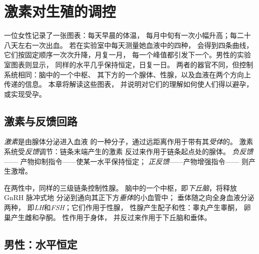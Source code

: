 \chapter{激素对生殖的调控}\label{ch:g11:hormones-and-reproduction}

一位女性记录了一张图表：每天早晨的体温，
每月中旬有一次小幅升高；每二十八天左右一次出血。
若在实验室中每天测量她血液中的四种，
会得到四条曲线，它们按固定顺序一次次升降，月复一月，
每一个峰值都引发下一个。男性的实验室图表则显示，
同样的水平几乎保持恒定，日复一日。
两者的器官不同，但控制系统相同：脑中的一个中枢、
其下方的一个腺体、性腺，以及血液在两个方向上传递的信息。
本章将解读这些图表，
并说明对它们的理解如何使人们得以避孕，
或实现受孕。

\section{激素与反馈回路}

\begin{definition}[激素，反馈]\label{def:g11:hormones-and-reproduction:hormone}
\emph{激素}是由腺体分泌进入血液
的一种分子，通过远距离作用于带有其\emph{受体}的。
激素系统受\emph{反馈}调节：链条末端产生的激素
反过来作用于链条起点处的腺体。
\emph{负反馈}——
产物抑制指令——使某一水平保持恒定；
\emph{正反馈}——产物增强指令——
则产生激增。
\end{definition}

\begin{proposition}[共同的链条]\label{prop:g11:hormones-and-reproduction:chain}
在两性中，同样的三级链条控制性腺。
脑中的一个中枢，即\emph{下丘脑}，将释放 GnRH 脉冲式地
分泌到通向其正下方\emph{垂体}的小血管中；
垂体随之向全身血液分泌两种，
即\emph{LH}和\emph{FSH}；它们作用于性腺，
性腺产生配子和性：睾丸产生睾酮，
卵巢产生雌和孕酮。
性作用于身体，
并反过来作用于下丘脑和垂体。
\end{proposition}
\admitted

\section{男性：水平恒定}

